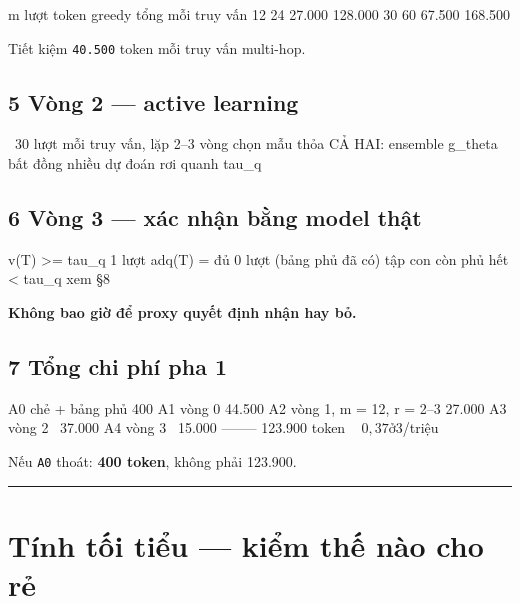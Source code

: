 \documentclass[11pt,a4paper]{article}
\begin{document}
\begin{dia}
m      lượt    token greedy    tổng mỗi truy vấn
12      24        27.000          128.000
30      60        67.500          168.500
\end{dia}

Tiết kiệm \texttt{40.500} token mỗi truy vấn multi-hop.

\subsection{5 Vòng 2 — active learning}

\begin{dia}
~30 lượt mỗi truy vấn, lặp 2–3 vòng
chọn mẫu thỏa CẢ HAI:
    ensemble g_theta bất đồng nhiều
    dự đoán rơi quanh tau_q
\end{dia}

\subsection{6 Vòng 3 — xác nhận bằng model thật}

\begin{dia}
v(T) >= tau_q                      1 lượt
adq(T) = đủ                     0 lượt  (bảng phủ đã có)
tập con còn phủ hết < tau_q       xem §8
\end{dia}

\textbf{Không bao giờ để proxy quyết định nhận hay bỏ.}

\subsection{7 Tổng chi phí pha 1}

\begin{dia}
A0  chẻ + bảng phủ                        400
A1  vòng 0                             44.500
A2  vòng 1,  m = 12,  r = 2–3          27.000
A3  vòng 2                            ~37.000
A4  vòng 3                            ~15.000
                                     --------
                                      123.900 token  ~  $0,37    ở $3/triệu
\end{dia}

Nếu \texttt{A0} thoát: \textbf{400 token}, không phải 123.900.

\vspace{0.3em}\hrule\vspace{0.6em}

\section{Tính tối tiểu — kiểm thế nào cho rẻ}
\end{document}
